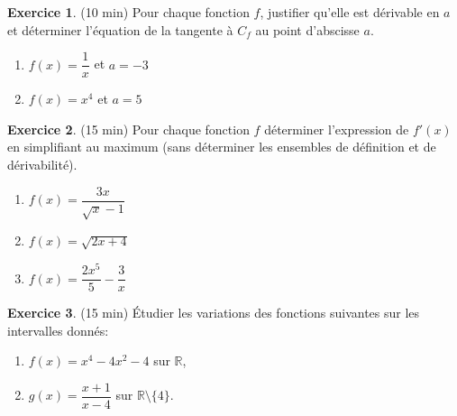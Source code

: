 \documentclass{exam}
\theoremstyle{definition}
\newtheorem{exercice}{Exercice}
\begin{document}
\begin{exercice}{(10 min)}
    Pour chaque fonction $f$, justifier qu’elle est dérivable en $a$ et déterminer l’équation de la tangente à $C_f$ au point d’abscisse $a$.
    \begin{enumerate}
        \item $f(x) = \dfrac{1}{x}$ et $a = -3$
        \item $f(x) = x^4$ et $a = 5$
    \end{enumerate}
    \end{exercice}
    
    \begin{exercice}{(15 min)}
    Pour chaque fonction $f$ déterminer l'expression de $f'(x)$ en simplifiant au maximum (sans déterminer les ensembles de définition et de dérivabilité).
    \begin{enumerate}
        \item $f(x) = \dfrac{3x}{\sqrt{x} - 1}$
        \item $f(x) = \sqrt{2x + 4}$
        \item $f(x) = \dfrac{2x^5}{5} - \dfrac{3}{x}$
    \end{enumerate}
    \end{exercice}
\begin{exercice}{(15 min)}
Étudier les variations des fonctions suivantes sur les intervalles donnés:
\begin{enumerate}
    \item $f(x) = x^4 - 4x^2 - 4$ sur $\mathbb{R}$,
    \item $g(x) = \dfrac{x+1}{x-4}$ sur $\mathbb{R} \setminus \{4\}$.
\end{enumerate}
\end{exercice}
\end{document}
